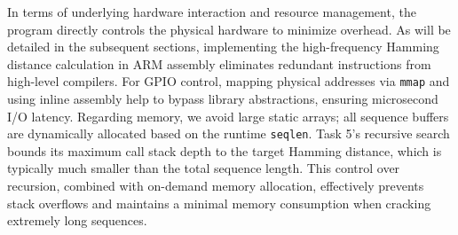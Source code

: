 In terms of underlying hardware interaction and resource management, the program directly controls the physical hardware to minimize overhead. As will be detailed in the subsequent sections, implementing the high-frequency Hamming distance calculation in ARM assembly eliminates redundant instructions from high-level compilers. For GPIO control, mapping physical addresses via \texttt{mmap} and using inline assembly help to bypass library abstractions, ensuring microsecond I/O latency. Regarding memory, we avoid large static arrays; all sequence buffers are dynamically allocated based on the runtime \texttt{seqlen}. Task 5's recursive search bounds its maximum call stack depth to the target Hamming distance, which is typically much smaller than the total sequence length. This control over recursion, combined with on-demand memory allocation, effectively prevents stack overflows and maintains a minimal memory consumption when cracking extremely long sequences.
